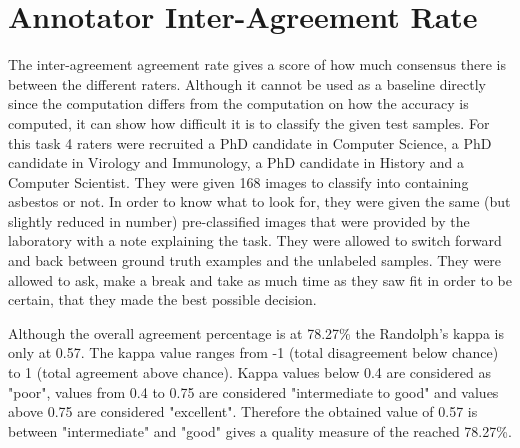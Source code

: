 \section{Annotator Inter-Agreement Rate}

The inter-agreement agreement rate gives a score of how much consensus there is between the different raters. Although it cannot be used as a baseline directly since the computation differs from the computation on how the accuracy is computed, it can show how difficult it is to classify the given test samples. For this task 4 raters were recruited a PhD candidate in Computer Science, a PhD candidate in Virology and Immunology, a PhD candidate in History and a Computer Scientist. They were given 168 images to classify into containing asbestos or not. In order to know what to look for, they were given the same (but slightly reduced in number) pre-classified images that were provided by the laboratory with a note explaining the task. They were allowed to switch forward and back between ground truth examples and the unlabeled samples. They were allowed to ask, make a break and take as much time as they saw fit in order to be certain, that they made the best possible decision.\\


\begin{table}[h] \centering
{}
\caption{Inter-agreement rate (Randolph's kappa) of 4 annotators.}
\label{tbl:interagreement}
\end{table}

\quad

Although the overall agreement percentage is at 78.27\% the Randolph's kappa is only at 0.57. The kappa value ranges from -1 (total disagreement below chance) to 1 (total agreement above chance). Kappa values below 0.4 are considered as "poor", values from 0.4 to 0.75  are considered "intermediate to good" and values  above 0.75 are considered "excellent". Therefore the obtained value of 0.57 is between "intermediate" and "good" gives a quality measure of the reached 78.27\%. \\











